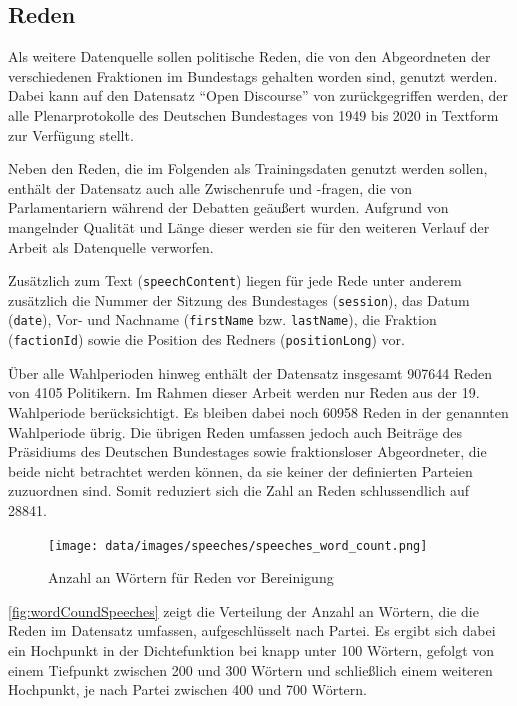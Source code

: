 \subsection*{Reden} \label{subsec:dataUnderstandingReden}

Als weitere Datenquelle sollen politische Reden, die von den Abgeordneten der verschiedenen Fraktionen im Bundestags gehalten worden sind, genutzt werden. Dabei kann auf den Datensatz \enquote{Open Discourse} von \textcite{richter_open_2021} zurückgegriffen werden, der alle Plenarprotokolle des Deutschen Bundestages von \num{1949} bis \num{2020} in Textform zur Verfügung stellt.

Neben den Reden, die im Folgenden als Trainingsdaten genutzt werden sollen, enthält der Datensatz auch alle Zwischenrufe und -fragen, die von Parlamentariern während der Debatten geäußert wurden. Aufgrund von mangelnder Qualität und Länge dieser werden sie für den weiteren Verlauf der Arbeit als Datenquelle verworfen.

Zusätzlich zum Text (\texttt{speechContent}) liegen für jede Rede unter anderem zusätzlich die Nummer der Sitzung des Bundestages (\texttt{session}), das Datum (\texttt{date}), Vor- und Nachname (\texttt{firstName} bzw. \texttt{lastName}), die Fraktion (\texttt{factionId}) sowie die Position des Redners (\texttt{positionLong}) vor.

Über alle Wahlperioden hinweg enthält der Datensatz insgesamt \num{907644} Reden von \num{4105} Politikern. Im Rahmen dieser Arbeit werden nur Reden aus der 19. Wahlperiode berücksichtigt. Es bleiben dabei noch \num{60958} Reden in der genannten Wahlperiode übrig. Die übrigen Reden umfassen jedoch auch Beiträge des Präsidiums des Deutschen Bundestages sowie fraktionsloser Abgeordneter, die beide nicht betrachtet werden können, da sie keiner der definierten Parteien zuzuordnen sind. Somit reduziert sich die Zahl an Reden schlussendlich auf \num{28841}.


\begin{figure}[H]
    \centering
    \texttt{[image: data/images/speeches/speeches\_word\_count.png]}
    \caption{Anzahl an Wörtern für Reden vor Bereinigung} \label{fig:wordCoundSpeeches}
\end{figure}

\autoref{fig:wordCoundSpeeches} zeigt die Verteilung der Anzahl an Wörtern, die die Reden im Datensatz umfassen, aufgeschlüsselt nach Partei. Es ergibt sich dabei ein Hochpunkt in der Dichtefunktion bei knapp unter 100 Wörtern, gefolgt von einem Tiefpunkt zwischen \num{200} und \num{300} Wörtern und schließlich einem weiteren Hochpunkt, je nach Partei zwischen 400 und 700 Wörtern.

